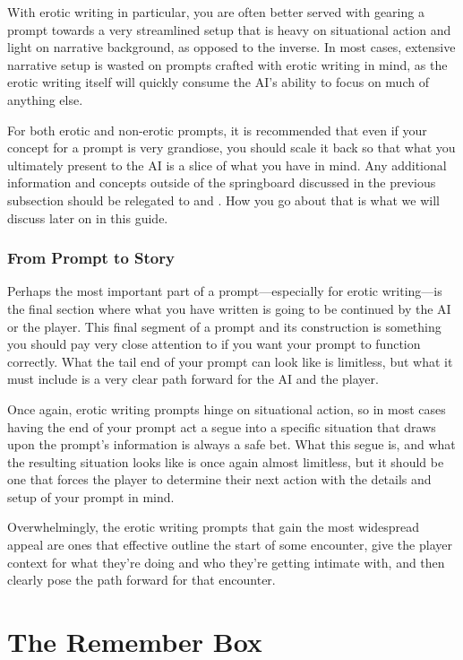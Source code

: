 ﻿\documentclass[Coomer-main.tex]{subfiles}
\begin{document}
With erotic writing in particular, you are often better served with gearing a prompt towards a very streamlined setup that is heavy on situational action and light on narrative background, as opposed to the inverse.
In most cases, extensive narrative setup is wasted on prompts crafted with erotic writing in mind, as the erotic writing itself will quickly consume the AI's ability to focus on much of anything else.

For both erotic and non-erotic prompts, it is recommended that even if your concept for a prompt is very grandiose, you should scale it back so that what you ultimately present to the AI is a slice of what you have in mind.
Any additional information and concepts outside of the springboard discussed in the previous subsection should be relegated to \rem and \wi.
How you go about that is what we will discuss later on in this guide.

\subsection{From Prompt to Story}

Perhaps the most important part of a prompt—especially for erotic writing—is the final section where what you have written is going to be continued by the AI or the player.
This final segment of a prompt and its construction is something you should pay very close attention to if you want your prompt to function correctly.
What the tail end of your prompt can look like is limitless, but what it must include is a very clear path forward for the AI and the player.

Once again, erotic writing prompts hinge on situational action, so in most cases having the end of your prompt act a segue into a specific situation that draws upon the prompt's information is always a safe bet.
What this segue is, and what the resulting situation looks like is once again almost limitless, but it should be one that forces the player to determine their next action with the details and setup of your prompt in mind.

Overwhelmingly, the erotic writing prompts that gain the most widespread appeal are ones that effective outline the start of some encounter, give the player context for what they're doing and who they're getting intimate with, and then clearly pose the path forward for that encounter.

\chapter{The Remember Box}
\label{ch:remember}
\end{document}
